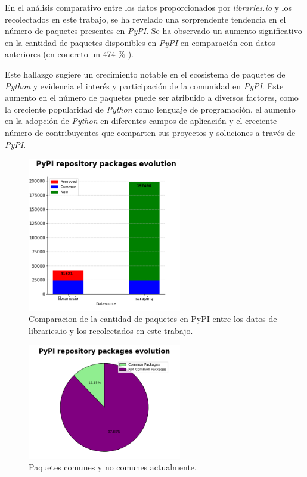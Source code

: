 En el análisis comparativo entre los datos proporcionados por \textit{libraries.io} y los recolectados en
este trabajo, se ha revelado una sorprendente tendencia en el número de paquetes presentes en \textit{PyPI}.
Se ha observado un aumento significativo en la cantidad de paquetes disponibles en \textit{PyPI} en
comparación con datos anteriores (en concreto un 474 \% ).

Este hallazgo sugiere un crecimiento notable en el ecosistema de paquetes de \textit{Python} y evidencia
el interés y participación de la comunidad en \textit{PyPI}. Este aumento en el número de paquetes puede
ser atribuido a diversos factores, como la creciente popularidad de \textit{Python} como lenguaje de
programación, el aumento en la adopción de \textit{Python} en diferentes campos de aplicación y el
creciente número de contribuyentes que comparten sus proyectos y soluciones a través de \textit{PyPI}.


\begin{figure}[h!]
    \begin{center}
        \includegraphics[width=0.6\textwidth]{img/pypi/bar_common_packages.png}
        \caption{Comparacion de la cantidad de paquetes en PyPI entre los datos de libraries.io y los recolectados en este trabajo.}
        \label{fig:pipy_common_packages_bar}
    \end{center}
\end{figure}

\begin{figure}[h!]
    \begin{center}
        \includegraphics[width=0.6\textwidth]{img/pypi/circ_common_packages.png}
        \caption{Paquetes comunes y no comunes actualmente.}
        \label{fig:pipy_common_packages_circle}
    \end{center}
\end{figure}

